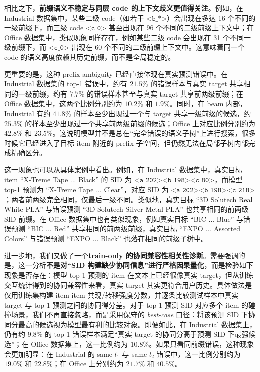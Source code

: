 \documentclass[11pt]{article}
\begin{document}
相比之下，\textbf{前缀语义不稳定与同层 code 的上下文歧义更值得关注}。例如，在 Industrial 数据集中，某些二级 code（如若干 $\texttt{<b\_*>}$）会出现在多达 16 个不同的一级前缀下，而三级 code $\texttt{<c\_0>}$ 甚至出现在 96 个不同的二级前缀上下文中；在 Office 数据集中，类似现象同样存在，例如某些二级 code 会出现在 31 个不同一级前缀下，而 $\texttt{<c\_0>}$ 出现在 60 个不同的二级前缀上下文中。这意味着同一个 code 的语义高度依赖其历史前缀，而不是全局稳定的。

更重要的是，这种 prefix ambiguity 已经直接体现在真实预测错误中。在 Industrial 数据集的 top-1 错误中，约有 $21.5\%$ 的错误样本与真实 target 共享相同的一级前缀，约有 $7.7\%$ 的错误样本甚至与真实 target 共享前两级前缀；在 Office 数据集中，这两个比例分别约为 $10.2\%$ 和 $1.9\%$。同时，在 beam 内部，Industrial 有约 $41.8\%$ 的样本至少出现过一个与 target 共享一级前缀的候选，约 $25.3\%$ 的样本至少出现过一个共享前两级前缀的候选；Office 上对应比例分别约为 $42.8\%$ 和 $23.5\%$。这说明模型并不是总在“完全错误的语义子树”上进行搜索，很多时候它已经进入了目标 item 附近的 prefix 子空间，但仍然无法在局部子树内部完成精确区分。

这一现象也可以从具体案例中看出。例如，在 Industrial 数据集中，真实目标 item ``X-Treme Tape ... Black'' 的 SID 为 $\texttt{<a\_202><b\_198><c\_80>}$，而模型 top-1 预测为 ``X-Treme Tape ... Clear''，对应 SID 为 $\texttt{<a\_202><b\_198><c\_218>}$；两者前两级完全相同，仅最后一级不同。类似地，真实目标 ``3D Solutech Real White PLA'' 与错误预测 ``3D Solutech Silver Metal PLA'' 也共享相同的前两级 SID 前缀。在 Office 数据集中也有类似现象，例如真实目标 ``BIC ... Blue'' 与错误预测 ``BIC ... Red'' 共享相同的前两级前缀，真实目标 ``EXPO ... Assorted Colors'' 与错误预测 ``EXPO ... Black'' 也落在相同的前缀子树中。

进一步地，我们又做了一个\textbf{train-only 的协同兼容性相关性诊断}。需要强调的是，这一分析\textbf{不是对“SID 构建缺少协同信息”进行严格因果量化}，而是检验如下现象是否存在：模型 top-1 预测的 item 在文本上已经很像真实 target，但从训练交互统计得到的协同兼容性来看，真实 target 其实更符合用户历史。具体做法是仅用训练集构建 item-item 共现/转移强度分数，并逐条比较测试样本中真实 target 与 top-1 预测之间的协同得分差。对于 top-1 预测 SID 对应多个 item 的碰撞场景，我们不再直接忽略，而是采用保守的 \textit{best-case} 口径：将该预测 SID 下协同分最高的候选视为模型最有利的比较对象。即便如此，在 Industrial 数据集上，仍有约 $9.8\%$ 的 top-1 错误样本满足“真实 target 的协同分高于预测 SID 下最强候选”；在 Office 数据集上，这一比例约为 $10.8\%$。如果只看同前缀错误，这种现象会更加明显：在 Industrial 的 same-$l_1$ 与 same-$l_2$ 错误中，这一比例分别约为 $19.0\%$ 和 $22.8\%$；在 Office 上分别约为 $21.7\%$ 和 $40.5\%$。
\end{document}
